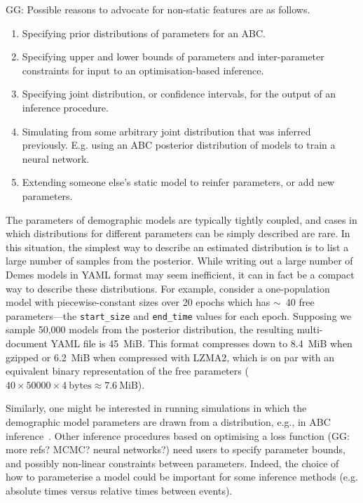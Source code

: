 \documentclass[11pt]{article}
\newcommand{\ggcomment}[1]{{\textcolor{yellow!60!red}{GG: #1}}}
\begin{document}
\ggcomment{
Possible reasons to advocate for non-static features are as follows.
\begin{enumerate}
\item Specifying prior distributions of parameters for an ABC.
\item Specifying upper and lower bounds of parameters and inter-parameter
      constraints for input to an optimisation-based inference.
\item Specifying joint distribution, or confidence intervals, for the output of
      an inference procedure.
\item Simulating from some arbitrary joint distribution that was inferred
      previously. E.g. using an ABC posterior distribution of models to
      train a neural network.
\item Extending someone else's static model to reinfer parameters,
      or add new parameters.
\end{enumerate}
}

The parameters of
demographic models are typically tightly coupled, and cases in which
distributions for different parameters can be simply described are rare.
In this situation, the simplest way to describe an estimated
distribution is to list a large number of samples from
the posterior. While writing out a large number of Demes models in
YAML format may seem inefficient, it can in fact be a compact
way to describe these distributions.
For example, consider a one-population model with piecewise-constant sizes over
20 epochs which has $\sim$~40 free parameters---the \texttt{start\_size} and
\texttt{end\_time} values for each epoch. Supposing we sample 50,000 models
from the posterior distribution, the resulting multi-document YAML file is
45~MiB.
This format compresses down to 8.4~MiB when gzipped or 6.2~MiB
when compressed with LZMA2, which is on par with an equivalent binary
representation of the free parameters
($40\times50000\times4~\text{bytes} \approx 7.6~\text{MiB}$).

Similarly, one might be interested in running simulations in which
the demographic model parameters are drawn from a distribution, e.g.,
in ABC inference~\citep{beaumont2002approximate}.
Other inference procedures based on optimising a loss function
\citep{gutenkunst2009inferring,kamm2017efficient,jouganous2017inferring}
(\ggcomment{more refs? MCMC? neural networks?})
need users to specify parameter bounds,
and possibly non-linear constraints between parameters.
Indeed, the choice of how to parameterise a model could be important for
some inference methods (e.g. absolute times versus relative times between events).
\end{document}
